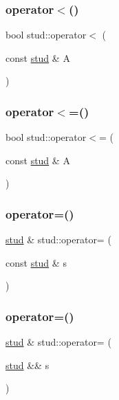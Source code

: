 \mbox{\label{structstud_a02cf4313f45a45c59f275472fb81526d}} 
\subsubsection{\texorpdfstring{operator$<$()}{operator<()}}
{\footnotesize\ttfamily bool stud\+::operator$<$ (\begin{DoxyParamCaption}\item[{const \mbox{\hyperlink{structstud}{stud}} \&}]{A }\end{DoxyParamCaption})}

\mbox{\label{structstud_ad1f3ff522a5fa70a9f3e2a0da74e05a5}} 
\subsubsection{\texorpdfstring{operator$<$=()}{operator<=()}}
{\footnotesize\ttfamily bool stud\+::operator$<$= (\begin{DoxyParamCaption}\item[{const \mbox{\hyperlink{structstud}{stud}} \&}]{A }\end{DoxyParamCaption})}

\mbox{\label{structstud_a5c04ca87f8701c19bd0753345bf66b89}} 
\subsubsection{\texorpdfstring{operator=()}{operator=()}\hspace{0.1cm}{\footnotesize\ttfamily [1/2]}}
{\footnotesize\ttfamily \mbox{\hyperlink{structstud}{stud}} \& stud\+::operator= (\begin{DoxyParamCaption}\item[{const \mbox{\hyperlink{structstud}{stud}} \&}]{s }\end{DoxyParamCaption})}

\mbox{\label{structstud_a206a6086ce2d924230032e923ba8fd6b}} 
\subsubsection{\texorpdfstring{operator=()}{operator=()}\hspace{0.1cm}{\footnotesize\ttfamily [2/2]}}
{\footnotesize\ttfamily \mbox{\hyperlink{structstud}{stud}} \& stud\+::operator= (\begin{DoxyParamCaption}\item[{\mbox{\hyperlink{structstud}{stud}} \&\&}]{s }\end{DoxyParamCaption})\hspace{0.3cm}{\ttfamily [noexcept]}}

